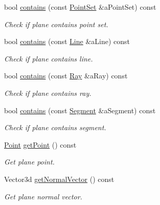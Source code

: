 \begin{DoxyCompactItemize}
bool \hyperlink{classostk_1_1math_1_1geom_1_1d3_1_1objects_1_1_plane_a5113cf47ca5ef948fa8f43074291108d}{contains} (const \hyperlink{classostk_1_1math_1_1geom_1_1d3_1_1objects_1_1_point_set}{Point\+Set} \&a\+Point\+Set) const
\begin{DoxyCompactList}\small\item\em Check if plane contains point set. \end{DoxyCompactList}\item 
bool \hyperlink{classostk_1_1math_1_1geom_1_1d3_1_1objects_1_1_plane_ad3cc8cc87bd61e8804bc4e207c662e5c}{contains} (const \hyperlink{classostk_1_1math_1_1geom_1_1d3_1_1objects_1_1_line}{Line} \&a\+Line) const
\begin{DoxyCompactList}\small\item\em Check if plane contains line. \end{DoxyCompactList}\item 
bool \hyperlink{classostk_1_1math_1_1geom_1_1d3_1_1objects_1_1_plane_a71b173f52939462f312dd0885931ca6a}{contains} (const \hyperlink{classostk_1_1math_1_1geom_1_1d3_1_1objects_1_1_ray}{Ray} \&a\+Ray) const
\begin{DoxyCompactList}\small\item\em Check if plane contains ray. \end{DoxyCompactList}\item 
bool \hyperlink{classostk_1_1math_1_1geom_1_1d3_1_1objects_1_1_plane_a229e30b431a2a2b8d00c02dbfba83e91}{contains} (const \hyperlink{classostk_1_1math_1_1geom_1_1d3_1_1objects_1_1_segment}{Segment} \&a\+Segment) const
\begin{DoxyCompactList}\small\item\em Check if plane contains segment. \end{DoxyCompactList}\item 
\hyperlink{classostk_1_1math_1_1geom_1_1d3_1_1objects_1_1_point}{Point} \hyperlink{classostk_1_1math_1_1geom_1_1d3_1_1objects_1_1_plane_a9e8b046781fec60f76faac94869908ec}{get\+Point} () const
\begin{DoxyCompactList}\small\item\em Get plane point. \end{DoxyCompactList}\item 
Vector3d \hyperlink{classostk_1_1math_1_1geom_1_1d3_1_1objects_1_1_plane_adad78a414d67a13cd87c9f5c569990ea}{get\+Normal\+Vector} () const
\begin{DoxyCompactList}\small\item\em Get plane normal vector. \end{DoxyCompactList}\item 

\end{DoxyCompactItemize}
